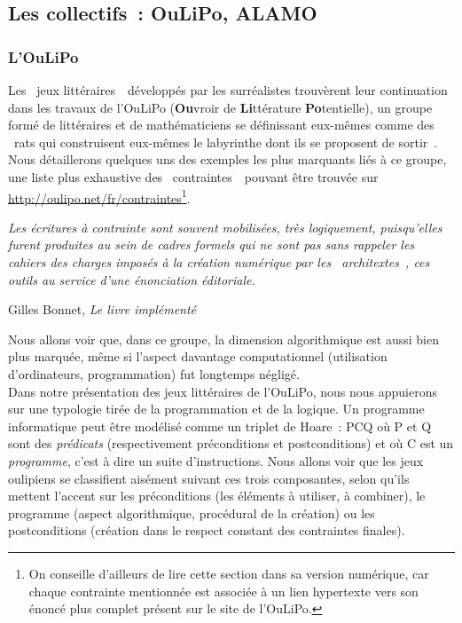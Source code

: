 \documentclass{article}
\newenvironment{citationbox}
{\begin{center}
		\begin{minipage}{.8\textwidth}
		}
		{
		\end{minipage}	
\end{center}
}
\begin{document}
		\subsection{Les collectifs~: OuLiPo, ALAMO}
			\subsubsection{L'OuLiPo}
				Les \guillemotleft~jeux littéraires~\guillemotright~développés par les surréalistes trouvèrent leur continuation dans les travaux de l'OuLiPo (\textbf{Ou}vroir de \textbf{Li}ttérature \textbf{Po}tentielle), un groupe formé de littéraires et de mathématiciens se définissant eux-mêmes comme des \guillemotleft~rats qui construisent eux-mêmes le labyrinthe dont ils se proposent de sortir~\guillemotright. Nous détaillerons quelques uns des exemples les plus marquants liés à ce groupe, une liste plus exhaustive des \guillemotleft~contraintes~\guillemotright~pouvant être trouvée sur \href{http://oulipo.net/fr/contraintes}{http://oulipo.net/fr/contraintes}\footnote{On conseille d'ailleurs de lire cette section dans sa version numérique, car chaque contrainte mentionnée est associée à un lien hypertexte vers son énoncé plus complet présent sur le site de l'OuLiPo.}.
				\begin{citationbox}
					\textit{Les écritures à contrainte sont souvent mobilisées, très logiquement, puisqu’elles furent produites au sein de cadres formels qui ne sont pas sans rappeler les cahiers des charges imposés à la création numérique par les \guillemotleft~architextes~\guillemotright, ces outils au service d’une énonciation éditoriale.}\begin{flushright}
						Gilles Bonnet, \textit{Le livre implémenté} \autocite{bonnet2017}
					\end{flushright}
				\end{citationbox}
				
				Nous allons voir que, dans ce groupe, la dimension algorithmique est aussi bien plus marquée, même si l'aspect davantage computationnel (utilisation d'ordinateurs, programmation) fut longtemps négligé.\\
				
				Dans notre présentation des jeux littéraires de l'OuLiPo, nous nous appuierons sur une typologie tirée de la programmation et de la logique. Un programme informatique peut être modélisé comme un triplet de Hoare~: {P}C{Q} où P et Q sont des \textit{prédicats} (respectivement préconditions et postconditions) et où C est un \textit{programme}, c'est à dire un suite d'instructions. Nous allons voir que les jeux oulipiens se classifient aisément suivant ces trois composantes, selon qu'ils mettent l'accent sur les préconditions (les éléments à utiliser, à combiner), le programme (aspect algorithmique, procédural de la création) ou les postconditions (création dans le respect constant des contraintes finales).
				
\end{document}
